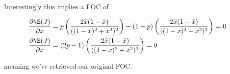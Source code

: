 Interestingly this implies a FOC of

\begin{align*}
	\frac{\partial \E(J)}{\partial \bar{x}} &= p \left(\frac{2 \bar{x} (1 - \bar{x})}{((1-\bar{x})^2 + \bar{x}^2)^2}\right) - (1-p) \left(\frac{2 \bar{x} (1 - \bar{x})}{((1-\bar{x})^2 + \bar{x}^2)^2} \right) = 0 \\
	\frac{\partial \E(J)}{\partial \bar{x}} &= (2p -1) \left(\frac{2 \bar{x} (1 - \bar{x})}{((1-\bar{x})^2 + \bar{x}^2)^2}\right) = 0
\end{align*} 

meaning we've retrieved our original FOC.










